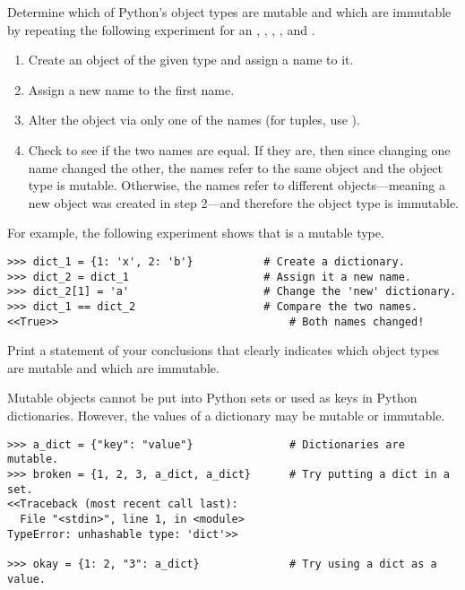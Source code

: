 \begin{problem} %
Determine which of Python's object types are mutable and which are immutable by repeating the following experiment for an , , , , and .
\begin{enumerate}
    \item Create an object of the given type and assign a name to it.
    \item Assign a new name to the first name.
    \item Alter the object via only one of the names (for tuples, use ).
    \item Check to see if the two names are equal.
    If they are, then since changing one name changed the other, the names refer to the same object and the object type is mutable.
    Otherwise, the names refer to different objects---meaning a new object was created in step 2---and therefore the object type is immutable.
\end{enumerate}
For example, the following experiment shows that  is a mutable type.
\begin{lstlisting}
>>> dict_1 = {1: 'x', 2: 'b'}           # Create a dictionary.
>>> dict_2 = dict_1                     # Assign it a new name.
>>> dict_2[1] = 'a'                     # Change the 'new' dictionary.
>>> dict_1 == dict_2                    # Compare the two names.
<<True>>                                    # Both names changed!
\end{lstlisting}
Print a statement of your conclusions that clearly indicates which object types are mutable and which are immutable.
\end{problem}

\begin{warn} %
Mutable objects cannot be put into Python sets or used as keys in Python dictionaries.
However, the values of a dictionary may be mutable or immutable.
\begin{lstlisting}
>>> a_dict = {"key": "value"}               # Dictionaries are mutable.
>>> broken = {1, 2, 3, a_dict, a_dict}      # Try putting a dict in a set.
<<Traceback (most recent call last):
  File "<stdin>", line 1, in <module>
TypeError: unhashable type: 'dict'>>

>>> okay = {1: 2, "3": a_dict}              # Try using a dict as a value.
\end{lstlisting}
\end{warn}


